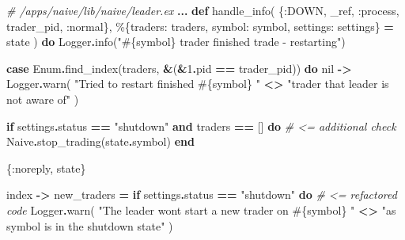 \documentclass[
]{book}
\newenvironment{Shaded}{\begin{snugshade}}{\end{snugshade}}
\newcommand{\CommentTok}[1]{\textcolor[rgb]{0.56,0.35,0.01}{\textit{#1}}}
\newcommand{\ConstantTok}[1]{\textcolor[rgb]{0.00,0.00,0.00}{#1}}
\newcommand{\ControlFlowTok}[1]{\textcolor[rgb]{0.13,0.29,0.53}{\textbf{#1}}}
\newcommand{\DecValTok}[1]{\textcolor[rgb]{0.00,0.00,0.81}{#1}}
\newcommand{\KeywordTok}[1]{\textcolor[rgb]{0.13,0.29,0.53}{\textbf{#1}}}
\newcommand{\NormalTok}[1]{#1}
\newcommand{\OperatorTok}[1]{\textcolor[rgb]{0.81,0.36,0.00}{\textbf{#1}}}
\newcommand{\OtherTok}[1]{\textcolor[rgb]{0.56,0.35,0.01}{#1}}
\newcommand{\StringTok}[1]{\textcolor[rgb]{0.31,0.60,0.02}{#1}}
\newcommand{\VariableTok}[1]{\textcolor[rgb]{0.00,0.00,0.00}{#1}}
\begin{document}
\begin{Shaded}
\begin{Highlighting}[]
\CommentTok{\# /apps/naive/lib/naive/leader.ex}
  \OperatorTok{...}
  \KeywordTok{def}\NormalTok{ handle\_info(}
\NormalTok{        \{}\VariableTok{:DOWN}\NormalTok{, \_ref, }\VariableTok{:process}\NormalTok{, trader\_pid, }\VariableTok{:normal}\NormalTok{\},}
\NormalTok{        \%\{}\VariableTok{traders:}\NormalTok{ traders, }\VariableTok{symbol:}\NormalTok{ symbol, }\VariableTok{settings:}\NormalTok{ settings\} }\OperatorTok{=}\NormalTok{ state}
\NormalTok{      ) }\KeywordTok{do}
    \ConstantTok{Logger}\OperatorTok{.}\NormalTok{info(}\StringTok{"}\OtherTok{\#\{}\NormalTok{symbol}\OtherTok{\}}\StringTok{ trader finished trade {-} restarting"}\NormalTok{)}

    \KeywordTok{case} \ConstantTok{Enum}\OperatorTok{.}\NormalTok{find\_index(traders, }\OperatorTok{\&}\NormalTok{(}\OperatorTok{\&}\DecValTok{1}\OperatorTok{.}\NormalTok{pid }\OperatorTok{==}\NormalTok{ trader\_pid)) }\KeywordTok{do}
      \ConstantTok{nil} \OperatorTok{{-}\textgreater{}}
        \ConstantTok{Logger}\OperatorTok{.}\NormalTok{warn(}
          \StringTok{"Tried to restart finished }\OtherTok{\#\{}\NormalTok{symbol}\OtherTok{\}}\StringTok{ "} \OperatorTok{\textless{}\textgreater{}}
            \StringTok{"trader that leader is not aware of"}
\NormalTok{        )}

        \ControlFlowTok{if}\NormalTok{ settings}\OperatorTok{.}\NormalTok{status }\OperatorTok{==} \StringTok{"shutdown"} \KeywordTok{and}\NormalTok{ traders }\OperatorTok{==}\NormalTok{ [] }\KeywordTok{do} \CommentTok{\# \textless{}= additional check}
          \ConstantTok{Naive}\OperatorTok{.}\NormalTok{stop\_trading(state}\OperatorTok{.}\NormalTok{symbol)}
        \KeywordTok{end}

\NormalTok{        \{}\VariableTok{:noreply}\NormalTok{, state\}}

\NormalTok{      index }\OperatorTok{{-}\textgreater{}}
\NormalTok{        new\_traders }\OperatorTok{=}
          \ControlFlowTok{if}\NormalTok{ settings}\OperatorTok{.}\NormalTok{status }\OperatorTok{==} \StringTok{"shutdown"} \KeywordTok{do} \CommentTok{\# \textless{}= refactored code}
            \ConstantTok{Logger}\OperatorTok{.}\NormalTok{warn(}
              \StringTok{"The leader won\textquotesingle{}t start a new trader on }\OtherTok{\#\{}\NormalTok{symbol}\OtherTok{\}}\StringTok{ "} \OperatorTok{\textless{}\textgreater{}}
                \StringTok{"as symbol is in the \textquotesingle{}shutdown\textquotesingle{} state"}
\NormalTok{            )}
            

\end{Highlighting}
\end{Shaded}
\end{document}
